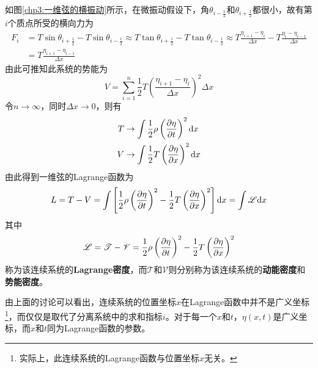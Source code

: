 如图\ref{chp3:一维弦的横振动}所示，在微振动假设下，角$\theta_{i-\frac12}$和$\theta_{i+\frac12}$都很小，故有第$i$个质点所受的横向力为
\begin{align}
	F_i & = T\sin \theta_{i+\frac12} - T\sin \theta_{i-\frac12} \approx T\tan \theta_{i+\frac12} - T\tan \theta_{i-\frac12} \approx T \frac{\eta_{i+1}-\eta_i}{\Delta x} - T \frac{\eta_i-\eta_{i-1}}{\Delta x} \nonumber \\
	& = T\frac{\eta_{i+1}-\eta_{i-1}}{\Delta x}
	\label{连续系统的Lagrange方程-2}
\end{align}
由此可推知此系统的势能为
\begin{equation}
	V = \sum_{i=1}^n \frac12 T\left(\frac{\eta_{i+1}-\eta_i}{\Delta x}\right)^2 \Delta x
	\label{连续系统的Lagrange方程-3}
\end{equation}
令$n \to \infty$，同时$\Delta x\to 0$，则有
\begin{align}
	T & \to \int \frac12 \rho \left(\frac{\partial \eta}{\partial t}\right)^2 \mathrm{d}x \label{连续系统的Lagrange方程-4} \\
	V & \to \int \frac12 T\left(\frac{\partial \eta}{\partial x}\right)^2 \mathrm{d}x \label{连续系统的Lagrange方程-5}
\end{align}
由此得到一维弦的Lagrange函数为
\begin{equation}
	L = T-V = \int \left[\frac12 \rho \left(\frac{\partial \eta}{\partial t}\right)^2 - \frac12 T\left(\frac{\partial \eta}{\partial x}\right)^2\right] \mathrm{d}x = \int \mathscr{L} \mathrm{d}x
	\label{连续系统的Lagrange方程-5.5}
\end{equation}
其中
\begin{equation}
	\mathscr{L} = \mathscr{T} - \mathscr{V} = \frac12 \rho \left(\frac{\partial \eta}{\partial t}\right)^2 - \frac12 T \left(\frac{\partial \eta}{\partial x}\right)^2 
	\label{连续系统的Lagrange方程-6}
\end{equation}
称为该连续系统的{\bf Lagrange密度}，而$\mathscr{T}$和$\mathscr{V}$则分别称为该连续系统的{\bf 动能密度}和{\bf 势能密度}。

由上面的讨论可以看出，连续系统的位置坐标$x$在Lagrange函数中并不是广义坐标\footnote{实际上，此连续系统的Lagrange函数与位置坐标$x$无关。}，而仅仅是取代了分离系统中的求和指标$i$。对于每一个$x$和$t$，$\eta(x,t)$是广义坐标，而$x$和$t$同为Lagrange函数的参数。


